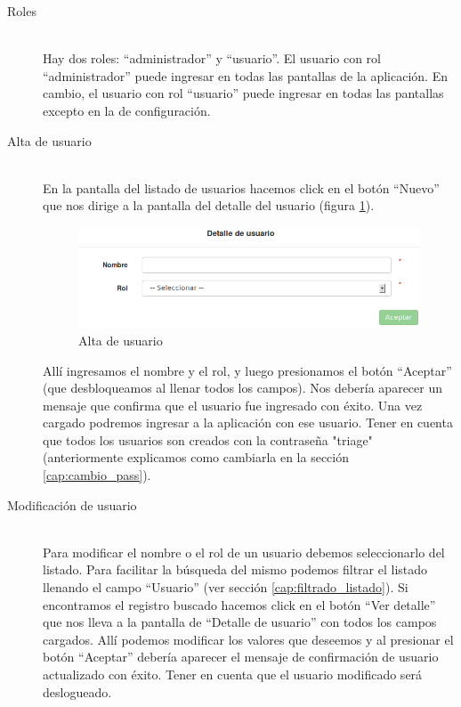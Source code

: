 \begin{description}
\item[Roles] \mbox{} \\
Hay dos roles: ``administrador'' y ``usuario''. El usuario con rol ``administrador'' puede ingresar en todas las pantallas de la aplicación. En cambio, el usuario con rol ``usuario'' puede ingresar en todas las pantallas excepto en la de configuración.

\item[Alta de usuario] \mbox{} \\
En la pantalla del listado de usuarios hacemos click en el botón ``Nuevo'' que nos dirige a la pantalla del detalle del usuario (figura \ref{fig:nuevo_usuario}).
\begin{figure}
\centerline{\includegraphics[width=1\textwidth]{nuevo_usuario.png}}
\caption{Alta de usuario}
\label{fig:nuevo_usuario}
\end{figure}
Allí ingresamos el nombre y el rol, y luego presionamos el botón ``Aceptar'' (que desbloqueamos al llenar todos los campos). Nos debería aparecer un mensaje que confirma que el usuario fue ingresado con éxito. Una vez cargado podremos ingresar a la aplicación con ese usuario. Tener en cuenta que todos los usuarios son creados con la contraseña "triage" (anteriormente explicamos como cambiarla en la sección \ref{cap:cambio_pass}).

\item[Modificación de usuario] \mbox{} \\
Para modificar el nombre o el rol de un usuario debemos seleccionarlo del listado. Para facilitar la búsqueda del mismo podemos filtrar el listado llenando el campo ``Usuario'' (ver sección \ref{cap:filtrado_listado}). Si encontramos el registro buscado hacemos click en el botón ``Ver detalle'' que nos lleva a la pantalla de ``Detalle de usuario'' con todos los campos cargados. Allí podemos modificar los valores que deseemos y al presionar el botón ``Aceptar'' debería aparecer el mensaje de confirmación de usuario actualizado con éxito. Tener en cuenta que el usuario modificado será deslogueado.


\end{description}
